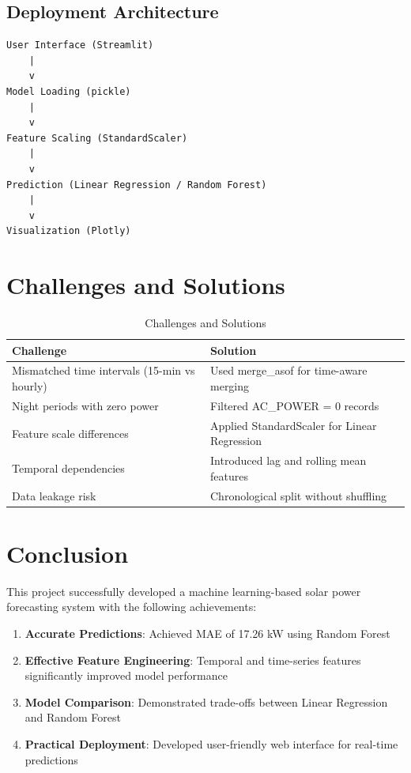 \documentclass[12pt,a4paper]{article}
\begin{document}
\subsection{Deployment Architecture}
\begin{verbatim}
User Interface (Streamlit)
    |
    v
Model Loading (pickle)
    |
    v
Feature Scaling (StandardScaler)
    |
    v
Prediction (Linear Regression / Random Forest)
    |
    v
Visualization (Plotly)
\end{verbatim}

\section{Challenges and Solutions}

\begin{table}[h]
\centering
\begin{tabular}{@{}p{5cm}p{7cm}@{}}
\toprule
\textbf{Challenge} & \textbf{Solution} \\ \midrule
Mismatched time intervals (15-min vs hourly) & Used merge\_asof for time-aware merging \\
Night periods with zero power & Filtered AC\_POWER = 0 records \\
Feature scale differences & Applied StandardScaler for Linear Regression \\
Temporal dependencies & Introduced lag and rolling mean features \\
Data leakage risk & Chronological split without shuffling \\ \bottomrule
\end{tabular}
\caption{Challenges and Solutions}
\label{tab:challenges}
\end{table}

\section{Conclusion}

This project successfully developed a machine learning-based solar power forecasting system with the following achievements:

\begin{enumerate}
    \item \textbf{Accurate Predictions}: Achieved MAE of 17.26 kW using Random Forest
    \item \textbf{Effective Feature Engineering}: Temporal and time-series features significantly improved model performance
    \item \textbf{Model Comparison}: Demonstrated trade-offs between Linear Regression and Random Forest
    \item \textbf{Practical Deployment}: Developed user-friendly web interface for real-time predictions
\end{enumerate}
\end{document}

